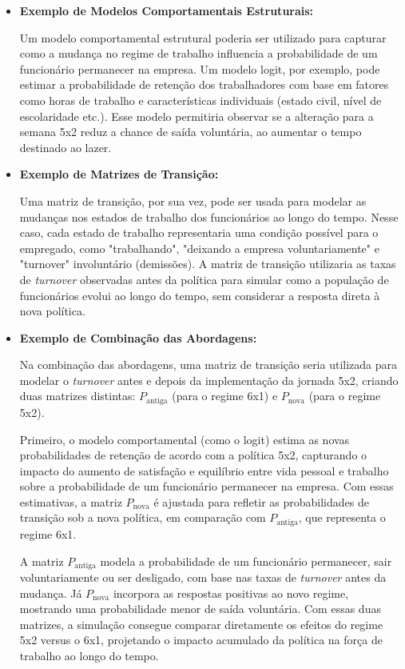 \documentclass[12pt, a4paper, openany]{book}
\numberwithin{equation}{chapter}
\numberwithin{table}{chapter}
\numberwithin{figure}{chapter}
\theoremstyle{break}
\begin{document}
\begin{itemize}
    \item \textbf{Exemplo de Modelos Comportamentais Estruturais:}

    Um modelo comportamental estrutural poderia ser utilizado para capturar como a mudança no regime de trabalho influencia a probabilidade de um funcionário permanecer na empresa. Um modelo logit, por exemplo, pode estimar a probabilidade de retenção dos trabalhadores com base em fatores como horas de trabalho e características individuais (estado civil, nível de escolaridade etc.). Esse modelo permitiria observar se a alteração para a semana 5x2 reduz a chance de saída voluntária, ao aumentar o tempo destinado ao lazer.

    \item \textbf{Exemplo de Matrizes de Transição:}

    Uma matriz de transição, por sua vez, pode ser usada para modelar as mudanças nos estados de trabalho dos funcionários ao longo do tempo. Nesse caso, cada estado de trabalho representaria uma condição possível para o empregado, como "trabalhando", "deixando a empresa voluntariamente" e "turnover" involuntário (demissões). A matriz de transição utilizaria as taxas de \textit{turnover} observadas antes da política para simular como a população de funcionários evolui ao longo do tempo, sem considerar a resposta direta à nova política.

    \item \textbf{Exemplo de Combinação das Abordagens:}

    Na combinação das abordagens, uma matriz de transição seria utilizada para modelar o \textit{turnover} antes e depois da implementação da jornada 5x2, criando duas matrizes distintas: \( P_{\text{antiga}} \) (para o regime 6x1) e \( P_{\text{nova}} \) (para o regime 5x2).

    Primeiro, o modelo comportamental (como o logit) estima as novas probabilidades de retenção de acordo com a política 5x2, capturando o impacto do aumento de satisfação e equilíbrio entre vida pessoal e trabalho sobre a probabilidade de um funcionário permanecer na empresa. Com essas estimativas, a matriz \( P_{\text{nova}} \) é ajustada para refletir as probabilidades de transição sob a nova política, em comparação com \( P_{\text{antiga}} \), que representa o regime 6x1.

    A matriz \( P_{\text{antiga}} \) modela a probabilidade de um funcionário permanecer, sair voluntariamente ou ser desligado, com base nas taxas de \textit{turnover} antes da mudança. Já \( P_{\text{nova}} \) incorpora as respostas positivas ao novo regime, mostrando uma probabilidade menor de saída voluntária. Com essas duas matrizes, a simulação consegue comparar diretamente os efeitos do regime 5x2 versus o 6x1, projetando o impacto acumulado da política na força de trabalho ao longo do tempo.
\end{itemize}
\end{document}
